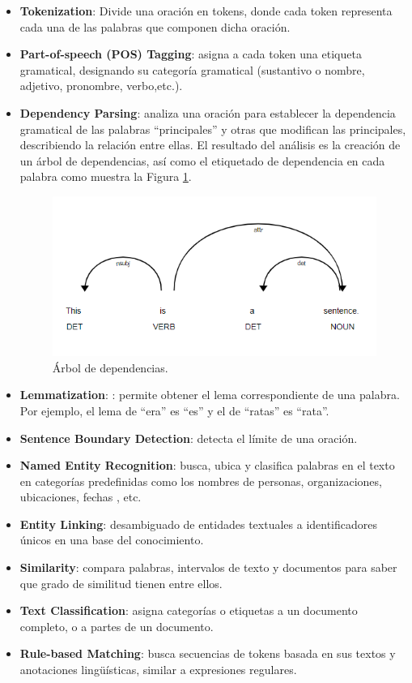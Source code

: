 \begin{itemize}
	\item \textbf{Tokenization}: Divide una oración en tokens, donde cada token	representa cada una de las palabras que componen dicha oración.
	\item \textbf{Part-of-speech (POS) Tagging}: asigna a cada token una etiqueta gramatical, designando su categoría gramatical (sustantivo o nombre, adjetivo, pronombre, verbo,etc.).
	\item \textbf{Dependency Parsing}: analiza una oración para establecer la dependencia gramatical de las palabras ``principales'' y otras que modifican las principales, describiendo la relación entre ellas. El resultado del análisis es la creación de un árbol de dependencias, así como el etiquetado de dependencia en cada palabra como muestra la Figura \ref{fig:dependeciaSpacy}. 
	\begin{figure}[h!]
		\centering
		
		
		\includegraphics[scale=1]{Imagenes/Figuras/dependenciaSpacy}
		
		
		\caption{Árbol de dependencias.}
		\label{fig:dependeciaSpacy}
	\end{figure}
	
	

	\item \textbf{Lemmatization}: : permite obtener el lema correspondiente de una
	palabra. Por ejemplo, el lema de ``era'' es ``es'' y el de ``ratas'' es ``rata''.
	\item \textbf{Sentence Boundary Detection}: detecta el límite de una oración.
	\item \textbf{Named Entity Recognition}: busca, ubica y clasifica palabras en el texto en categorías predefinidas como los nombres de personas, organizaciones, ubicaciones, fechas , etc. 
	\item \textbf{Entity Linking}: desambiguado de entidades textuales a identificadores únicos en una base del conocimiento.
	\item \textbf{Similarity}: compara palabras, intervalos de texto y documentos para saber que grado de similitud tienen entre ellos.
	\item \textbf{Text Classification}: asigna categorías o etiquetas a un documento completo, o a partes de un documento.
	\item \textbf{Rule-based Matching}: busca secuencias de tokens basada en sus textos y anotaciones lingüísticas, similar a expresiones regulares.

\end{itemize}

